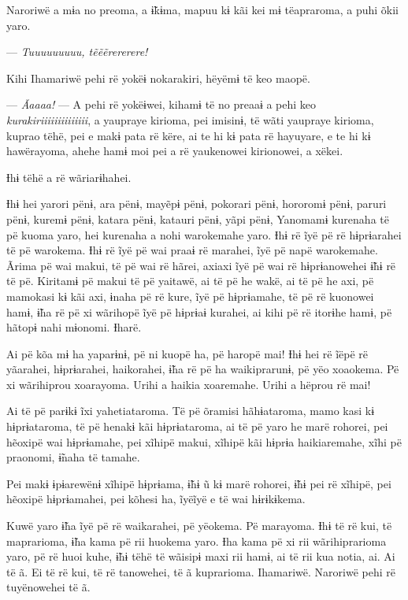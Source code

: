 Naroriwë a mɨa no preoma, a ɨ̃kɨma, mapuu kɨ kãi kei mɨ tëapraroma, a
puhi õkii yaro. 

--- \textit{Tuuuuuuuuu, tẽẽẽrererere!} 

Kihi Ihamariwë pehi rë yokëɨ nokarakiri, hëyëmɨ të keo maopë.

--- \textit{Ãaaaa!} --- A pehi rë yokëɨwei, kihamɨ të no preaaɨ a pehi keo
\textit{kurakiriiiiiiiiiiiiii}, a yaupraye kirioma, pei imisinɨ, të wãti yaupraye
kirioma, kuprao tëhë, pei e makɨ pata rë këre, ai te hi kɨ pata rë
hayuyare, e te hi kɨ hawërayoma, ahehe hamɨ moi pei a rë yaukenowei
kirionowei, a xëkei. 

Ɨhɨ tëhë a rë wãriarɨhahei. 

Ɨhɨ hei yarori pënɨ, ara pënɨ, mayẽpɨ pënɨ, pokorari pënɨ, hororomɨ
pënɨ, paruri pënɨ, kuremɨ pënɨ, katara pënɨ, katauri pënɨ, yãpi pënɨ,
Yanomamɨ kurenaha të pë kuoma yaro, hei kurenaha a nohi warokemahe yaro.
Ɨhɨ rë ĩyë pë rë hɨprɨarahei të pë warokema. Ɨhɨ rë ĩyë pë wai praaɨ rë
marahei, ĩyë pë napë warokemahe. Ãrima pë wai makui, të pë wai rë hãrei,
axiaxi ĩyë pë wai rë hɨprɨanowehei ɨ̃hɨ rë të pë. Kiritamɨ pë makui të pë
yaitawë, ai të pë he wakë, ai të pë he axi, pë mamokasi kɨ kãi axi,
ɨnaha pë rë kure, ĩyë pë hɨprɨamahe, të pë rë kuonowei hamɨ, ɨ̃ha rë pë
xi wãrihopë ĩyë pë hɨprɨaɨ kurahei, ai kihi pë rë itorɨhe hamɨ, pë
hãtopɨ nahi mɨonomi. Ɨharë. 

Ai pë kõa mɨ ha yaparɨnɨ, pë ni kuopë ha, pë haropë mai! Ɨhɨ hei rë ĩëpë
rë yãarahei, hɨprɨarahei, haikorahei, ɨ̃ha rë pë ha waikiprarunɨ, pë yëo
xoaokema. Pë xi wãrihiprou xoarayoma. Urihi a haikia xoaremahe. Urihi a
hëprou rë mai! 

Ai të pë parɨkɨ ĩxi yahetiataroma. Të pë õramisi hãhɨataroma, mamo kasi
 kɨ hɨprɨataroma, të pë henakɨ kãi hɨprɨataroma, ai të pë yaro he marë
 rohorei, pei hẽoxipë wai hɨprɨamahe, pei xĩhipë makui, xĩhipë kãi hɨprɨa
 haikiaremahe, xĩhi pë praonomi, ɨ̃naha të tamahe.

Pei makɨ ɨpɨarewënɨ xĩhipë hɨprɨama, ɨ̃hɨ ũ kɨ marë rohorei, ɨ̃hɨ pei rë
xĩhipë, pei hẽoxipë hɨprɨamahei, pei kõhesi ha, ĩyëĩyë e të wai
hɨrɨkɨkema. 

Kuwë yaro ɨ̃ha ĩyë pë rë waikarahei, pë yëokema. Pë marayoma. Ɨhɨ të rë
 kui, të maprarioma, ɨ̃ha kama pë rii huokema yaro. Ɨha kama pë xi rii
 wãrihiprarioma yaro, pë rë huoi kuhe, ɨ̃hɨ tëhë të wãisipɨ maxi rii hamɨ,
 ai të rii kua notia, ai. Ai të ã. Ei të rë kui, të rë tanowehei, të ã
 kuprarioma. Ihamariwë. Naroriwë pehi rë tuyënowehei të ã. 

